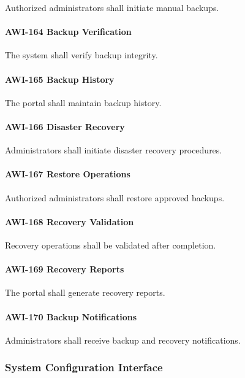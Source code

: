 Authorized administrators shall initiate manual backups.

\paragraph{AWI-164 Backup Verification}

The system shall verify backup integrity.

\paragraph{AWI-165 Backup History}

The portal shall maintain backup history.

\paragraph{AWI-166 Disaster Recovery}

Administrators shall initiate disaster recovery procedures.

\paragraph{AWI-167 Restore Operations}

Authorized administrators shall restore approved backups.

\paragraph{AWI-168 Recovery Validation}

Recovery operations shall be validated after completion.

\paragraph{AWI-169 Recovery Reports}

The portal shall generate recovery reports.

\paragraph{AWI-170 Backup Notifications}

Administrators shall receive backup and recovery notifications.


\subsubsection*{System Configuration Interface}

